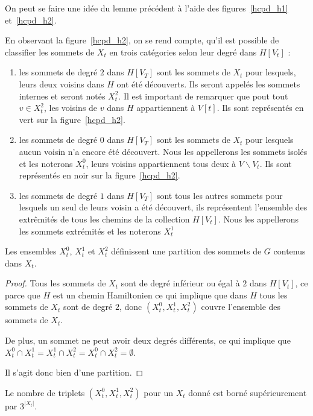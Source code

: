 On peut se faire une idée du lemme précédent à l'aide des figures~\ref{hcpd_h1}
et~\ref{hcpd_h2}.

En observant la figure~\ref{hcpd_h2}, on se rend compte, qu'il est possible de classifier les
sommets de $X_t$ en trois catégories selon leur degré dans $H[V_t]$ :
\begin{enumerate}
    \item les sommets de degré $2$ dans $H[V_T]$ sont les sommets de $X_t$ pour lesquels, leurs
        deux voisins dans $H$ ont été découverts. Ils seront appelés les sommets internes et seront
        notés $X_t^2$. Il est important de remarquer que pout tout $v \in X_t^2$, les voisins de $v$
        dans $H$ appartiennent à $V[t]$. Ils sont représentés en vert sur la figure~\ref{hcpd_h2}.
    \item les sommets de degré $0$ dans $H[V_T]$ sont les sommets de $X_t$ pour lesquels aucun
        voisin n'a encore été découvert. Nous les appellerons les sommets isolés et les noterons
        $X_t^0$, leurs voisins appartiennent tous deux à $V\backslash V_t$. Ils sont représentés en noir sur
        la figure~\ref{hcpd_h2}.
    \item les sommets de degré $1$ dans $H[V_T]$ sont tous les autres sommets pour lesquels un seul
        de leurs voisin a été découvert, ils représentent l'ensemble des extrêmités de tous les
        chemins de la collection $H[V_t]$. Nous les appellerons les sommets extrémités et les
        noterons $X_t^1$
\end{enumerate}

\begin{nlemma}
    Les ensembles $X_t^0$, $X_t^1$ et $X_t^2$ définissent une partition des sommets de $G$ contenus
    dans $X_t$.
\end{nlemma}

\begin{proof}
    Tous les sommets de $X_t$ sont de degré inférieur ou égal à $2$ dans $H[V_t]$, ce parce que $H$
    est un chemin Hamiltonien ce qui implique que dans $H$ tous les sommets de $X_t$ sont de degré
    $2$, donc $(X_t^0, X_t^1, X_t^2)$ couvre l'ensemble des sommets de $X_t$.

    De plus, un sommet ne peut avoir deux degrés différents, ce qui implique que $X_t^0 \cap X_t^1 =
    X_t^1 \cap X_t^2 = X_t^0 \cap X_t^2 = \emptyset$.

    Il s'agit donc bien d'une partition.
\end{proof}

\begin{ncorol}
    \label{hcpd_ntrip}
    Le nombre de triplets $(X_t^0, X_t^1, X_t^2)$ pour un $X_t$ donné est borné supérieurement par
    $3^{|X_t|}$.
\end{ncorol}

